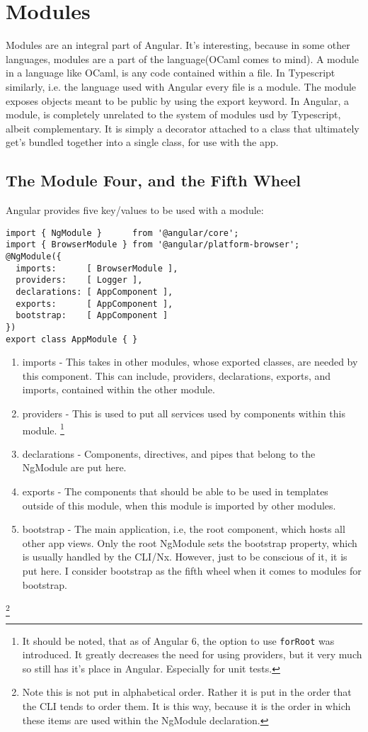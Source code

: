 \section{ Modules }


Modules are an integral part of Angular. It's interesting, because in some
other languages, modules are a part of the language(OCaml comes to mind). A
module in a language like OCaml, is any code contained within a file. In
Typescript similarly, i.e. the language used with Angular every file is a
module. The module exposes objects meant to be public by using the export
keyword. In Angular, a module, is completely unrelated to the system of modules
usd by Typescript, albeit complementary. It is simply a decorator attached to a
class that ultimately get's bundled together into a single class, for use with
the app.

\subsection{The Module Four, and the Fifth Wheel}
Angular provides five key/values to be used with a module:
\begin{lstlisting}
import { NgModule }      from '@angular/core';
import { BrowserModule } from '@angular/platform-browser';
@NgModule({
  imports:      [ BrowserModule ],
  providers:    [ Logger ],
  declarations: [ AppComponent ],
  exports:      [ AppComponent ],
  bootstrap:    [ AppComponent ]
})
export class AppModule { }
\end{lstlisting}

\begin{enumerate}
  \item imports - This takes in other modules, whose exported classes, are
  needed by this component. This can include, providers, declarations, exports,
  and imports, contained within the other module.
  \item providers - This is used to put all services used by components within
  this module. \footnote{It should be noted, that as of Angular 6, the option
  to use \lstinline{forRoot} was introduced. It greatly decreases the need for
  using providers, but it very much so still has it's place in Angular.
  Especially for unit tests.}
  \item declarations - Components, directives, and pipes that belong to the
  NgModule are put here.
  \item exports - The components that should be able to be used in templates
  outside of this module, when this module is imported by other modules.
  \item bootstrap - The main application, i.e, the root component, which hosts
  all other app views. Only the root NgModule sets the bootstrap property,
  which is usually handled by the CLI/Nx. However, just to be conscious of it,
  it is put here. I consider bootstrap as the fifth wheel when it comes to
  modules for bootstrap.
\end{enumerate}
\footnote{Note this is not put in alphabetical order. Rather it is put in the
order that the CLI tends to order them. It is this way, because it is the order
in which these items are used within the NgModule declaration.}
